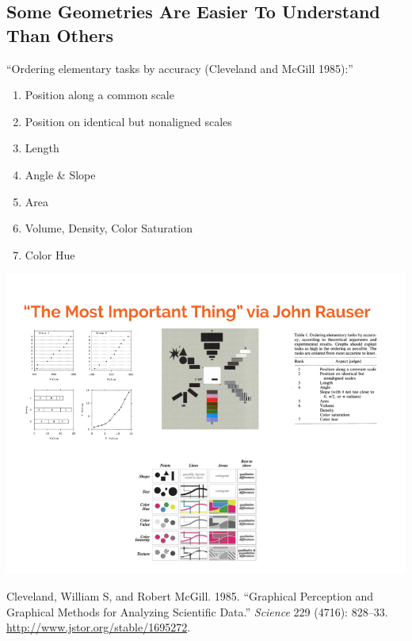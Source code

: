 \documentclass[]{article}
\providecommand{\tightlist}{%
  \setlength{\itemsep}{0pt}\setlength{\parskip}{0pt}}
\begin{document}
\hypertarget{some-geometries-are-easier-to-understand-than-others}{%
\subsection{Some Geometries Are Easier To Understand Than
Others}\label{some-geometries-are-easier-to-understand-than-others}}

``Ordering elementary tasks by accuracy (Cleveland and McGill 1985):''

\begin{enumerate}
\def\labelenumi{\arabic{enumi}.}
\tightlist
\item
  Position along a common scale
\item
  Position on identical but nonaligned scales
\item
  Length
\item
  Angle \& Slope
\item
  Area
\item
  Volume, Density, Color Saturation
\item
  Color Hue
\end{enumerate}

\includegraphics{Rauser-most-important-thing.png}

\hypertarget{refs}{}
\leavevmode\hypertarget{ref-Cleveland1985}{}%
Cleveland, William S, and Robert McGill. 1985. ``Graphical Perception
and Graphical Methods for Analyzing Scientific Data.'' \emph{Science}
229 (4716): 828--33. \url{http://www.jstor.org/stable/1695272}.
\end{document}
